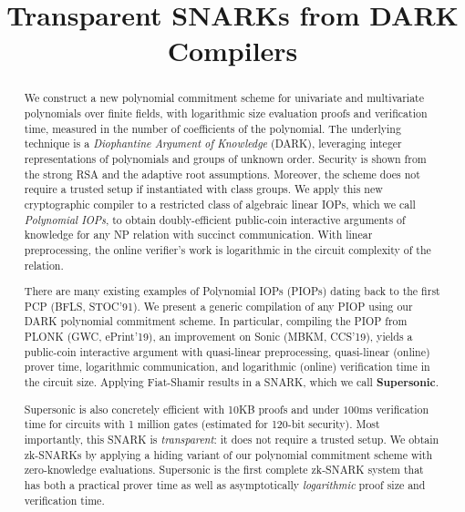 \documentclass[12pt]{article}
\title{Transparent SNARKs from DARK Compilers}
\author{}
\date{}
\theoremstyle{definition}
\begin{document}
\maketitle

\begin{abstract} 
We construct a new polynomial commitment scheme for univariate and multivariate polynomials over finite fields, with logarithmic size evaluation proofs and verification time, measured in the number of coefficients of the polynomial. The underlying technique is a \emph{Diophantine Argument of Knowledge} (DARK), leveraging integer representations of polynomials and groups of unknown order. Security is shown from the strong RSA and the adaptive root assumptions. Moreover, the scheme does not require a trusted setup if instantiated with class groups. We apply this new cryptographic compiler to a restricted class of algebraic linear IOPs, which we call \emph{Polynomial IOPs}, to obtain doubly-efficient public-coin interactive arguments of knowledge for any NP relation with succinct communication. With linear preprocessing, the online verifier's work is logarithmic in the circuit complexity of the relation.

There are many existing examples of Polynomial IOPs (PIOPs) dating back to the first PCP (BFLS, STOC'91). %
We present a generic compilation of any PIOP using our DARK polynomial commitment scheme. In particular, compiling the PIOP from \textsf{PLONK} (GWC, ePrint'19), an improvement on \textsf{Sonic} (MBKM, CCS'19), yields a public-coin interactive argument with quasi-linear preprocessing, quasi-linear (online) prover time, logarithmic communication, and logarithmic (online) verification time in the circuit size. Applying Fiat-Shamir results in a SNARK, which we call \textsf{\textbf{Supersonic}}. 

\textsf{Supersonic} is also concretely efficient with 10KB proofs and under $100$ms verification time for circuits with 1 million gates (estimated for 120-bit security). Most importantly, this SNARK is \emph{transparent}: it does not require a trusted setup. We obtain zk-SNARKs by applying a hiding variant of our polynomial commitment scheme with zero-knowledge evaluations. \textsf{Supersonic} is the first complete zk-SNARK system that has both a practical prover time as well as asymptotically \emph{logarithmic} proof size and verification time. 


\end{abstract} 
\end{document}

